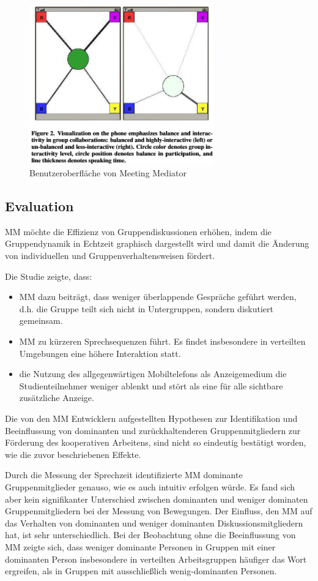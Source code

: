 \begin{figure}[htp] 
\centering 
\includegraphics[width=8cm]{mm.jpg}
\caption{Benutzeroberfläche von Meeting Mediator \protect\cite{MITbadge}}
\label{display}
\end{figure}


\subsection{Evaluation}
MM möchte die Effizienz von Gruppendiskussionen er\-höh\-en, indem die
Gruppendynamik in Echtzeit graphisch dargestellt wird und damit die Änderung von
 individuellen und Gruppenverhaltensweisen fördert.
 
Die Studie zeigte, dass:

\begin{itemize}
  \item MM dazu beiträgt, dass weniger überlappende Gespräche geführt werden, d.h. die
Gruppe teilt sich nicht in Untergruppen, sondern diskutiert gemeinsam.
  \item MM zu kürzeren Sprechsequenzen führt. Es findet insbesondere in verteilten
Umgebungen eine höhere Interaktion statt.
  \item die Nutzung des allgegenwärtigen Mobiltelefons als Anzeigemedium die
Studienteilnehmer weniger ablenkt und stört als eine für alle sichtbare
zusätzliche Anzeige.

\end{itemize}

Die von den MM Entwicklern aufgestellten Hypothesen zur Identifikation und
Beeinflussung von dominanten und zurückhaltenderen Gruppenmitgliedern zur
Förderung des kooperativen Arbeitens, sind nicht so eindeutig bestätigt worden,
wie die zuvor beschriebenen Effekte.

Durch die Messung der Sprechzeit identifizierte MM dominante Gruppenmitglieder
genauso, wie es auch intuitiv erfolgen würde. Es fand sich aber kein
signifikanter Unterschied zwischen dominanten und weniger dominaten
Gruppenmitgliedern bei der Messung von Bewegungen.
Der Einfluss, den MM auf das Verhalten von dominanten und weniger dominanten
Diskussionsmitgliedern hat, ist sehr unterschiedlich.
Bei der Beobachtung ohne die Beeinflussung von MM zeigte sich, dass weniger
dominante Personen in Gruppen mit einer dominanten Person insbesondere in
verteilten Arbeitsgruppen häufiger das Wort ergreifen, als in Gruppen mit
ausschließlich wenig-do\-min\-ant\-en Personen.

